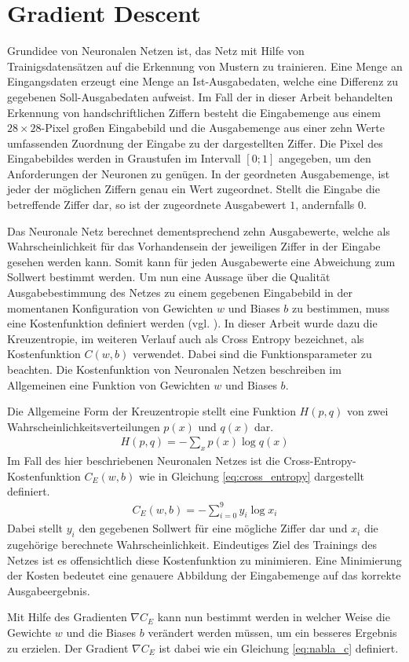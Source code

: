 \documentclass[../main.tex]{subfiles}
\begin{document}
\section{Gradient Descent}
Grundidee von Neuronalen Netzen ist, das Netz mit Hilfe von Trainigsdatensätzen auf die Erkennung von Mustern zu trainieren. Eine Menge an Eingangsdaten erzeugt eine Menge an Ist-Ausgabedaten, welche eine Differenz zu gegebenen Soll-Ausgabedaten aufweist. Im Fall der in dieser Arbeit behandelten Erkennung von handschriftlichen Ziffern besteht die Eingabemenge aus einem $28\times28$-Pixel großen Eingabebild und die Ausgabemenge aus einer zehn Werte umfassenden Zuordnung der Eingabe zu der dargestellten Ziffer. Die Pixel des Eingabebildes werden in Graustufen im Intervall $[0;1]$ angegeben, um den Anforderungen der Neuronen zu genügen. In der geordneten Ausgabemenge, ist jeder der möglichen Ziffern genau ein Wert zugeordnet. Stellt die Eingabe die betreffende Ziffer dar, so ist der zugeordnete Ausgabewert $1$, andernfalls $0$. \par Das Neuronale Netz berechnet dementsprechend zehn Ausgabewerte, welche als Wahrscheinlichkeit für das Vorhandensein der jeweiligen Ziffer in der Eingabe gesehen werden kann. Somit kann für jeden Ausgabewerte eine Abweichung zum Sollwert bestimmt werden. Um nun eine Aussage über die Qualität Ausgabebestimmung des Netzes zu einem gegebenen Eingabebild in der momentanen Konfiguration von Gewichten $w$ und Biases $b$ zu bestimmen, muss eine Kostenfunktion definiert werden (vgl. \cite{NNADL_PIC_CONV_1}). In dieser Arbeit wurde dazu die Kreuzentropie, im weiteren Verlauf auch als Cross Entropy bezeichnet, als Kostenfunktion $C(w,b)$ verwendet. Dabei sind die Funktionsparameter zu beachten. Die Kostenfunktion von Neuronalen Netzen beschreiben im Allgemeinen eine Funktion von Gewichten $w$ und Biases $b$. \par 
Die Allgemeine Form der Kreuzentropie stellt eine Funktion $H(p,q)$ von zwei Wahrscheinlichkeitsverteilungen $p(x)$ und $q(x)$ dar.
\begin{align}
	H(p,q) = - \sum_{x} p(x)\log q(x)
\end{align}
Im Fall des hier beschriebenen Neuronalen Netzes ist die Cross-Entropy-Kostenfunktion $C_E(w,b)$ wie in Gleichung \ref{eq:cross_entropy} dargestellt definiert.
\begin{align}
	C_E(w,b) = - \sum_{i=0}^{9} y_i\log x_i \label{eq:cross_entropy}
\end{align}
Dabei stellt $y_i$ den gegebenen Sollwert für eine mögliche Ziffer dar und $x_i$ die zugehörige berechnete Wahrscheinlichkeit. Eindeutiges Ziel des Trainings des Netzes ist es offensichtlich diese Kostenfunktion zu minimieren. Eine Minimierung der Kosten bedeutet eine genauere Abbildung der Eingabemenge auf das korrekte Ausgabeergebnis. \par Mit Hilfe des Gradienten $\nabla C_E$ kann nun bestimmt werden in welcher Weise die Gewichte $w$ und die Biases $b$ verändert werden müssen, um ein besseres Ergebnis zu erzielen. Der Gradient $\nabla C_E$ ist dabei wie ein Gleichung \ref{eq:nabla_c} definiert.
\end{document}
